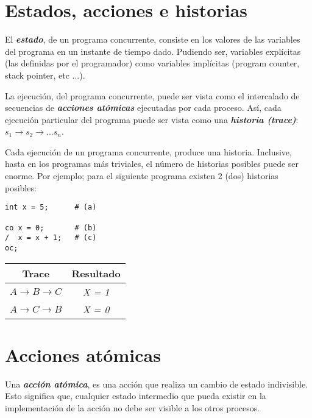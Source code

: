 \documentclass[a4paper, 10pt]{report}
\begin{document}
\section{Estados, acciones e historias}

El \textbf{\emph{estado}}, de un programa concurrente, consiste en los valores de las variables del programa en un instante de tiempo dado. Pudiendo ser, variables explícitas (las definidas por el programador) como variables implícitas (program counter, stack pointer, etc ...).

La ejecución, del programa concurrente, puede ser vista como el intercalado de secuencias de \textbf{\emph{acciones atómicas}} ejecutadas por cada proceso. Así, cada ejecución particular del programa puede ser vista como una \textbf{\emph{historia (trace)}}: $s_1 \rightarrow s_2 \rightarrow ... s_n$.

Cada ejecución de un programa concurrente, produce una historia. Inclusive, hasta en los programas más triviales, el número de historias posibles puede ser enorme. Por ejemplo; para el siguiente programa existen 2 (dos) historias posibles: 

\begin{multicols}{2}

\begin{lstlisting}
int x = 5;      # (a)

co x = 0;       # (b)
/  x = x + 1;   # (c)
oc;
\end{lstlisting}
\columnbreak
    {\renewcommand{\arraystretch}{2}%
    \centering
    \begin{tabular}{cc}
        \textbf{Trace} & \textbf{Resultado}\\
        \hline 
        $A \rightarrow B \rightarrow C$ & \emph{X = 1}\\ 
        $A \rightarrow C \rightarrow B$ & \emph{X = 0}\\ 
    \end{tabular}}
\end{multicols}

\section{Acciones atómicas}

Una \textbf{\emph{acción atómica}}, es una acción que realiza un cambio de estado indivisible. Esto significa que, cualquier estado intermedio que pueda existir en la implementación de la acción no debe ser visible a los otros procesos.
\end{document}
